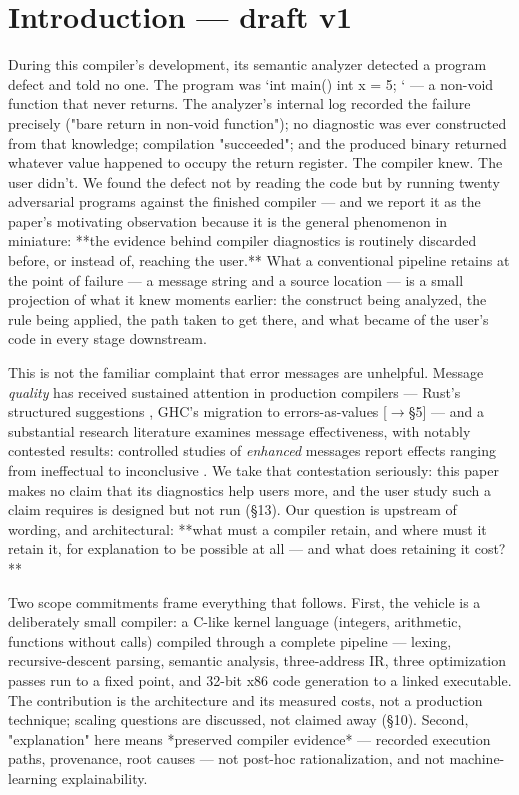 \section{Introduction --- draft v1}
\label{sec:intro}

During this compiler's development, its semantic analyzer detected a
program defect and told no one. The program was `int main() { int x
= 5; }` --- a non-void function that never returns. The analyzer's
internal log recorded the failure precisely ("bare return in
non-void function"); no diagnostic was ever constructed from that
knowledge; compilation "succeeded"; and the produced binary returned
whatever value happened to occupy the return register. The compiler
knew. The user didn't. We found the defect not by reading the code
but by running twenty adversarial programs against the finished
compiler --- and we report it as the paper's motivating observation
because it is the general phenomenon in miniature: **the evidence
behind compiler diagnostics is routinely discarded before, or
instead of, reaching the user.** What a conventional pipeline
retains at the point of failure --- a message string and a source
location --- is a small projection of what it knew moments earlier:
the construct being analyzed, the rule being applied, the path taken
to get there, and what became of the user's code in every stage
downstream.

This is not the familiar complaint that error messages are unhelpful.
Message \emph{quality} has received sustained attention in production
compilers --- Rust's structured suggestions \cite{rust-rfc1644}, GHC's migration to
errors-as-values \cite{ghc-structured-errors} [$\rightarrow$\S5] --- and a substantial research literature
examines message effectiveness, with notably contested results:
controlled studies of \emph{enhanced} messages report effects ranging
from ineffectual to inconclusive \cite{denny2014enhancing,pettit2017enhanced}. We take that contestation seriously: this
paper makes no claim that its diagnostics help users more, and the
user study such a claim requires is designed but not run (\S13). Our
question is upstream of wording, and architectural: **what must a
compiler retain, and where must it retain it, for explanation to be
possible at all --- and what does retaining it cost?**

Two scope commitments frame everything that follows. First, the
vehicle is a deliberately small compiler: a C-like kernel language
(integers, arithmetic, functions without calls) compiled through a
complete pipeline --- lexing, recursive-descent parsing, semantic
analysis, three-address IR, three optimization passes run to a fixed
point, and 32-bit x86 code generation to a linked executable. The
contribution is the architecture and its measured costs, not a
production technique; scaling questions are discussed, not claimed
away (\S10). Second, "explanation" here means *preserved compiler
evidence* --- recorded execution paths, provenance, root causes --- not
post-hoc rationalization, and not machine-learning explainability.

